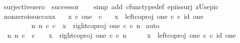 \begin{isabellebody}
\ {\isachardoublequoteopen}surjective{\isacharparenleft}{\kern0pt}zero\ {\isasymamalg}\ successor{\isacharparenright}{\kern0pt}{\isachardoublequoteclose}\isanewline
%
\isadelimproof
\ \ %
\endisadelimproof
%
\isatagproof
{}\isamarkupfalse%
\ {\isacharparenleft}{\kern0pt}simp\ add{\isacharcolon}{\kern0pt}\ cfunc{\isacharunderscore}{\kern0pt}type{\isacharunderscore}{\kern0pt}def\ epi{\isacharunderscore}{\kern0pt}is{\isacharunderscore}{\kern0pt}surj\ zUs{\isacharunderscore}{\kern0pt}epic{\isacharparenright}{\kern0pt}%
\endisatagproof
{\isafoldproof}%
%
\isadelimproof
\isanewline
%
\endisadelimproof
\isanewline
{}\isamarkupfalse%
\ nonzero{\isacharunderscore}{\kern0pt}is{\isacharunderscore}{\kern0pt}succ{\isacharunderscore}{\kern0pt}aux{\isacharcolon}{\kern0pt}\isanewline
\ \ \ {\isachardoublequoteopen}x\ {\isasymin}\isactrlsub c\ {\isacharparenleft}{\kern0pt}one\ {\isasymCoprod}\ {\isasymnat}\isactrlsub c{\isacharparenright}{\kern0pt}{\isachardoublequoteclose}\isanewline
\ \ \ {\isachardoublequoteopen}{\isacharparenleft}{\kern0pt}x\ {\isacharequal}{\kern0pt}\ {\isacharparenleft}{\kern0pt}left{\isacharunderscore}{\kern0pt}coproj\ one\ {\isasymnat}\isactrlsub c{\isacharparenright}{\kern0pt}\ {\isasymcirc}\isactrlsub c\ id\ one{\isacharparenright}{\kern0pt}\ {\isasymor}\isanewline
\ \ \ \ \ \ \ \ \ {\isacharparenleft}{\kern0pt}{\isasymexists}n{\isachardot}{\kern0pt}\ {\isacharparenleft}{\kern0pt}n\ {\isasymin}\isactrlsub c\ {\isasymnat}\isactrlsub c{\isacharparenright}{\kern0pt}\ {\isasymand}\ {\isacharparenleft}{\kern0pt}x\ {\isacharequal}{\kern0pt}\ {\isacharparenleft}{\kern0pt}right{\isacharunderscore}{\kern0pt}coproj\ one\ {\isasymnat}\isactrlsub c{\isacharparenright}{\kern0pt}\ {\isasymcirc}\isactrlsub c\ n{\isacharparenright}{\kern0pt}{\isacharparenright}{\kern0pt}{\isachardoublequoteclose}\isanewline
%
\isadelimproof
%
\endisadelimproof
%
\isatagproof
{}\isamarkupfalse%
\ auto\isanewline
\ \ \isamarkupfalse%
\ {\isachardoublequoteopen}{\isasymforall}\ n{\isachardot}{\kern0pt}\ n\ {\isasymin}\isactrlsub c\ \ {\isasymnat}\isactrlsub c\ \ {\isasymlongrightarrow}\ \ x\ {\isasymnoteq}\ right{\isacharunderscore}{\kern0pt}coproj\ one\ {\isasymnat}\isactrlsub c\ {\isasymcirc}\isactrlsub c\ n{\isachardoublequoteclose}\isanewline
\ \ \isamarkupfalse%
\ \isamarkupfalse%
\ {\isachardoublequoteopen}x\ {\isacharequal}{\kern0pt}\ left{\isacharunderscore}{\kern0pt}coproj\ one\ {\isasymnat}\isactrlsub c\ {\isasymcirc}\isactrlsub c\ id\ one{\isachardoublequoteclose}\isanewline

\end{isabellebody}

